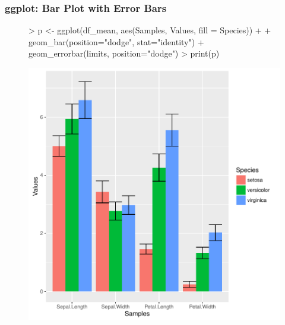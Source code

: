 \documentclass{beamer}
\begin{document}
\begin{frame}[containsverbatim]  
	\frametitle{ggplot: Bar Plot with Error Bars}
\scriptsize 
\begin{figure}
  \centering
\begin{Schunk}
\begin{Sinput}
> p <- ggplot(df_mean, aes(Samples, Values, fill = Species)) + 
+ 	    geom_bar(position="dodge", stat="identity") + geom_errorbar(limits, position="dodge") 
> print(p) 
\end{Sinput}
\end{Schunk}
\includegraphics{fig--060}
\label{fig:qplotscatter}
\end{figure}
\end{frame}
\end{document}
